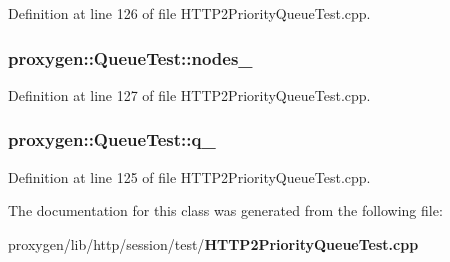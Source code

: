 Definition at line 126 of file H\+T\+T\+P2\+Priority\+Queue\+Test.\+cpp.

\subsubsection[{nodes\+\_\+}]{ proxygen\+::\+Queue\+Test\+::nodes\+\_\+\hspace{0.3cm}{\ttfamily [protected]}}\label{classproxygen_1_1QueueTest_a099c4952d286ed210d19e97d3d00fa90}


Definition at line 127 of file H\+T\+T\+P2\+Priority\+Queue\+Test.\+cpp.

\subsubsection[{q\+\_\+}]{ proxygen\+::\+Queue\+Test\+::q\+\_\+\hspace{0.3cm}{\ttfamily [protected]}}\label{classproxygen_1_1QueueTest_ab35e84135af6564566d36de78f67b1a3}


Definition at line 125 of file H\+T\+T\+P2\+Priority\+Queue\+Test.\+cpp.



The documentation for this class was generated from the following file\+:\begin{DoxyCompactItemize}
\item 
proxygen/lib/http/session/test/{\bf H\+T\+T\+P2\+Priority\+Queue\+Test.\+cpp}\end{DoxyCompactItemize}
